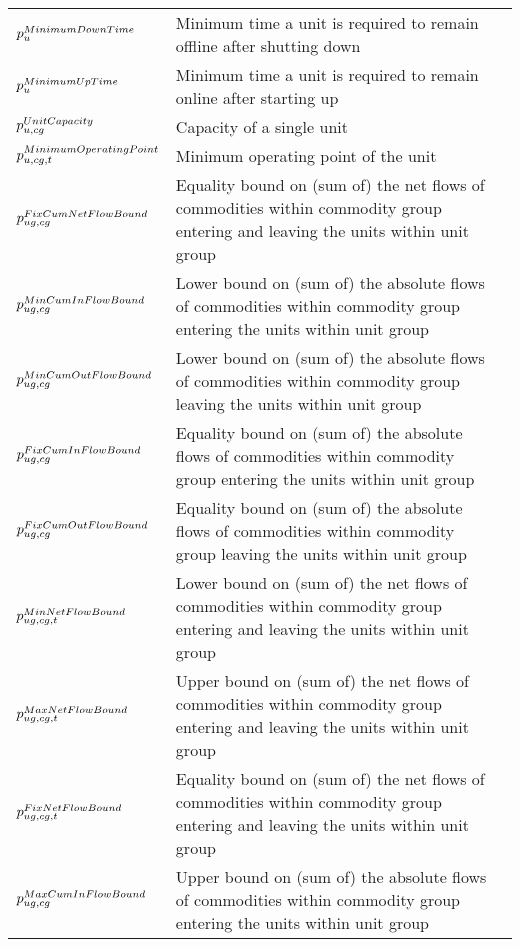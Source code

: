 \begin{longtable}{p{\cola} p{\colc} >{\small\raggedleft\arraybackslash\itshape}p{\colb}}
		$p^{MinimumDownTime}_{u}$	& Minimum time a unit is required to remain offline after shutting down	&                \\
		$p^{MinimumUpTime}_{u}$	& Minimum time a unit is required to remain online after starting up	&                \\
		$p^{UnitCapacity}_{u,cg} $	& Capacity of a single unit                                   	&                \\
		$p^{MinimumOperatingPoint}_{u,cg,t}$	& Minimum operating point of the unit                         	&                \\
		$p^{FixCumNetFlowBound}_{ug,cg}$	& Equality bound on (sum of) the net flows of commodities within commodity group \commoditygroup entering and leaving the units within unit group \unitgroup 	&                \\
		$p^{MinCumInFlowBound}_{ug,cg}$	& Lower bound on (sum of) the absolute flows of commodities within commodity group \commoditygroup entering the units within unit group \unitgroup 	&                \\
		$p^{MinCumOutFlowBound}_{ug,cg}$	& Lower bound on (sum of) the absolute flows of commodities within commodity group \commoditygroup leaving the units within unit group \unitgroup 	&                \\
		$p^{FixCumInFlowBound}_{ug,cg}$	& Equality bound on (sum of) the absolute flows of commodities within commodity group \commoditygroup entering the units within unit group \unitgroup 	&                \\
		$p^{FixCumOutFlowBound}_{ug,cg}$	& Equality bound on (sum of) the absolute flows of commodities within commodity group \commoditygroup leaving the units within unit group \unitgroup 	&                \\
		$p^{MinNetFlowBound}_{ug,cg,t}$	& Lower bound on (sum of) the net flows of commodities within commodity group \commoditygroup entering and leaving the units within unit group \unitgroup 	&                \\
		$p^{MaxNetFlowBound}_{ug,cg,t}$	& Upper bound on (sum of) the net flows of commodities within commodity group \commoditygroup entering and leaving the units within unit group \unitgroup 	&                \\
		$p^{FixNetFlowBound}_{ug,cg,t}$	& Equality bound on (sum of) the net flows of commodities within commodity group \commoditygroup entering and leaving the units within unit group \unitgroup 	&                \\
		$p^{MaxCumInFlowBound}_{ug,cg}$	& Upper bound on (sum of) the absolute flows of commodities within commodity group \commoditygroup entering the units within unit group \unitgroup 	&                \\

\end{longtable}
